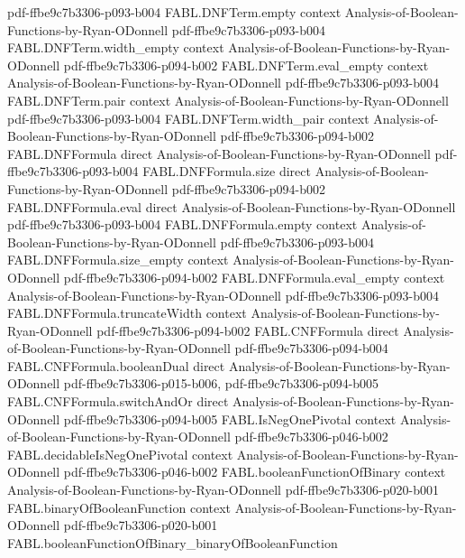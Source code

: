 \begin{theorem}
  {pdf-ffbe9c7b3306-p093-b004}
\proofstep
  {FABL.DNFTerm.empty}
  {context}
  {Analysis-of-Boolean-Functions-by-Ryan-ODonnell}
  {pdf-ffbe9c7b3306-p093-b004}
\proofstep
  {FABL.DNFTerm.width_empty}
  {context}
  {Analysis-of-Boolean-Functions-by-Ryan-ODonnell}
  {pdf-ffbe9c7b3306-p094-b002}
\proofstep
  {FABL.DNFTerm.eval_empty}
  {context}
  {Analysis-of-Boolean-Functions-by-Ryan-ODonnell}
  {pdf-ffbe9c7b3306-p093-b004}
\proofstep
  {FABL.DNFTerm.pair}
  {context}
  {Analysis-of-Boolean-Functions-by-Ryan-ODonnell}
  {pdf-ffbe9c7b3306-p093-b004}
\proofstep
  {FABL.DNFTerm.width_pair}
  {context}
  {Analysis-of-Boolean-Functions-by-Ryan-ODonnell}
  {pdf-ffbe9c7b3306-p094-b002}
\proofstep
  {FABL.DNFFormula}
  {direct}
  {Analysis-of-Boolean-Functions-by-Ryan-ODonnell}
  {pdf-ffbe9c7b3306-p093-b004}
\proofstep
  {FABL.DNFFormula.size}
  {direct}
  {Analysis-of-Boolean-Functions-by-Ryan-ODonnell}
  {pdf-ffbe9c7b3306-p094-b002}
\proofstep
  {FABL.DNFFormula.eval}
  {direct}
  {Analysis-of-Boolean-Functions-by-Ryan-ODonnell}
  {pdf-ffbe9c7b3306-p093-b004}
\proofstep
  {FABL.DNFFormula.empty}
  {context}
  {Analysis-of-Boolean-Functions-by-Ryan-ODonnell}
  {pdf-ffbe9c7b3306-p093-b004}
\proofstep
  {FABL.DNFFormula.size_empty}
  {context}
  {Analysis-of-Boolean-Functions-by-Ryan-ODonnell}
  {pdf-ffbe9c7b3306-p094-b002}
\proofstep
  {FABL.DNFFormula.eval_empty}
  {context}
  {Analysis-of-Boolean-Functions-by-Ryan-ODonnell}
  {pdf-ffbe9c7b3306-p093-b004}
\proofstep
  {FABL.DNFFormula.truncateWidth}
  {context}
  {Analysis-of-Boolean-Functions-by-Ryan-ODonnell}
  {pdf-ffbe9c7b3306-p094-b002}
\proofstep
  {FABL.CNFFormula}
  {direct}
  {Analysis-of-Boolean-Functions-by-Ryan-ODonnell}
  {pdf-ffbe9c7b3306-p094-b004}
\proofstep
  {FABL.CNFFormula.booleanDual}
  {direct}
  {Analysis-of-Boolean-Functions-by-Ryan-ODonnell}
  {pdf-ffbe9c7b3306-p015-b006,
    pdf-ffbe9c7b3306-p094-b005}
\proofstep
  {FABL.CNFFormula.switchAndOr}
  {direct}
  {Analysis-of-Boolean-Functions-by-Ryan-ODonnell}
  {pdf-ffbe9c7b3306-p094-b005}
\proofstep
  {FABL.IsNegOnePivotal}
  {context}
  {Analysis-of-Boolean-Functions-by-Ryan-ODonnell}
  {pdf-ffbe9c7b3306-p046-b002}
\proofstep
  {FABL.decidableIsNegOnePivotal}
  {context}
  {Analysis-of-Boolean-Functions-by-Ryan-ODonnell}
  {pdf-ffbe9c7b3306-p046-b002}
\proofstep
  {FABL.booleanFunctionOfBinary}
  {context}
  {Analysis-of-Boolean-Functions-by-Ryan-ODonnell}
  {pdf-ffbe9c7b3306-p020-b001}
\proofstep
  {FABL.binaryOfBooleanFunction}
  {context}
  {Analysis-of-Boolean-Functions-by-Ryan-ODonnell}
  {pdf-ffbe9c7b3306-p020-b001}
\proofstep
  {FABL.booleanFunctionOfBinary_binaryOfBooleanFunction}

\end{theorem}
